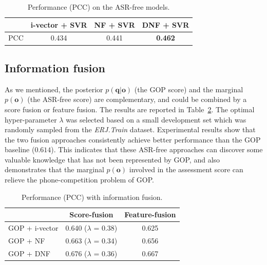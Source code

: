 \documentclass[a4paper]{article}
\begin{document}
\begin{table}[htb!]
 \begin{center}
  \caption{Performance (PCC) on the ASR-free models.}
  \vspace{-2mm}
   \label{tab:free}
     \begin{tabular}{l|c|c|c}
       \hline
                       &  i-vector + SVR  &  NF + SVR   &   DNF + SVR   \\
       \hline
             PCC       &    0.434         &  0.441      &   \textbf{0.462}        \\
       \hline
     \end{tabular}
 \end{center}
\end{table}
\vspace{-4mm}

\subsection{Information fusion}

As we mentioned, the posterior $p(\mathbf{q}|\mathbf{o})$ (the GOP score) and the marginal $p(\mathbf{o})$ (the ASR-free score)
are complementary, and could be combined by a score fusion or feature fusion. The results are reported in Table~\ref{tab:fusion}.
The optimal hyper-parameter $\lambda$ was selected based on a small development set which was randomly sampled from the \emph{ERJ.Train} dataset.
Experimental results show that the two fusion approaches consistently achieve better performance than the GOP baseline ($0.614$).
This indicates that these ASR-free approaches can discover some valuable knowledge that has not been represented by GOP,
and also demonstrates that the marginal $p(\mathbf{o})$ involved in the assessment score can relieve the phone-competition problem of GOP.

\begin{table}[htb!]
 \begin{center}
  \caption{Performance (PCC) with information fusion.}
  \vspace{-2mm}
   \label{tab:fusion}
     \begin{tabular}{l|c|c}
       \hline
                            &  Score-fusion                  &  Feature-fusion \\
       \hline
        GOP + i-vector      &    0.640 ($\lambda$ = 0.38)    &     0.625        \\
       \hline
        GOP + NF            &    0.663 ($\lambda$ = 0.34)    &     0.656        \\
       \hline
        GOP + DNF           &    0.676 ($\lambda$ = 0.36)    &     0.667        \\
       \hline
     \end{tabular}
 \end{center}
\end{table}
\vspace{-4mm}
\end{document}
